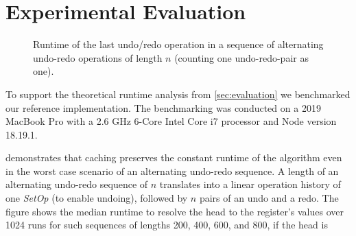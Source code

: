 \documentclass[sigplan]{acmart}
\newcommand{\setopkind}{\textit{SetOp}}
\begin{document}
\section{Experimental Evaluation}

\begin{figure}[b]
\caption{
  Runtime of the last undo/redo operation
  in a sequence of alternating undo-redo operations of length $n$
  (counting one undo-redo-pair as one).
}\label{fig:runtime-undo-redo-alt}
\end{figure}

To support the theoretical runtime analysis from \cref{sec:evaluation}
we benchmarked our reference implementation.
The benchmarking was conducted on a 2019 MacBook Pro with a 
2.6 GHz 6-Core Intel Core i7 processor and Node version 18.19.1.

 demonstrates that caching preserves
the constant runtime of the algorithm even in the worst case scenario of
an alternating undo-redo sequence.
A length of an alternating undo-redo sequence of $n$ translates into
a linear operation history of one \setopkind{} (to enable undoing),
followed by $n$ pairs of an undo and a redo.
The figure shows the median runtime to resolve the head to the
register's values over 1024 runs for such sequences of
lengths 200, 400, 600, and 800, if the head is
\end{document}
